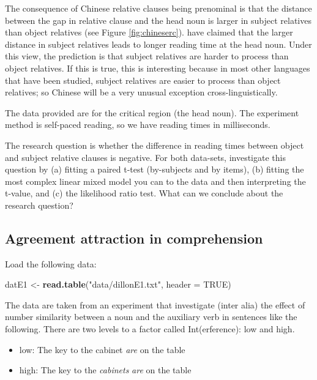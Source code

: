 \documentclass[12pt,]{krantz}
\newenvironment{Shaded}{\begin{snugshade}}{\end{snugshade}}
\newcommand{\DataTypeTok}[1]{\textcolor[rgb]{0.13,0.29,0.53}{#1}}
\newcommand{\KeywordTok}[1]{\textcolor[rgb]{0.13,0.29,0.53}{\textbf{#1}}}
\newcommand{\NormalTok}[1]{#1}
\newcommand{\OtherTok}[1]{\textcolor[rgb]{0.56,0.35,0.01}{#1}}
\newcommand{\StringTok}[1]{\textcolor[rgb]{0.31,0.60,0.02}{#1}}
\providecommand{\tightlist}{%
  \setlength{\itemsep}{0pt}\setlength{\parskip}{0pt}}
\begin{document}
The consequence of Chinese relative clauses being prenominal is that the distance between the gap in relative clause and the head noun is larger in subject relatives than object relatives (see Figure \ref{fig:chineserc}). \citet{hsiao03} have claimed that the larger distance in subject relatives leads to longer reading time at the head noun. Under this view, the prediction is that subject relatives are harder to process than object relatives. If this is true, this is interesting because in most other languages that have been studied, subject relatives are easier to process than object relatives; so Chinese will be a very unusual exception cross-linguistically.

The data provided are for the critical region (the head noun). The experiment method is self-paced reading, so we have reading times in milliseconds.

The research question is whether the difference in reading times between object and subject relative clauses is negative. For both data-sets, investigate this question by (a) fitting a paired t-test (by-subjects and by items), (b) fitting the most complex linear mixed model you can to the data and then interpreting the t-value, and (c) the likelihood ratio test. What can we conclude about the research question?

\hypertarget{sec:HypTestExerciseAgrmt}{%
\subsection{Agreement attraction in comprehension}\label{sec:HypTestExerciseAgrmt}}

Load the following data:

\begin{Shaded}
\begin{Highlighting}[]
\NormalTok{datE1 <-}\StringTok{ }\KeywordTok{read.table}\NormalTok{(}\StringTok{"data/dillonE1.txt"}\NormalTok{, }
  \DataTypeTok{header =} \OtherTok{TRUE}\NormalTok{)}
\end{Highlighting}
\end{Shaded}

The data are taken from an experiment that investigate (inter alia) the effect of number similarity between a noun and the auxiliary verb in sentences like the following. There are two levels to a factor called Int(erference): low and high.

\begin{itemize}
\tightlist
\item
  low: The key to the cabinet \emph{are} on the table
\item
  high: The key to the \emph{cabinets} \emph{are} on the table
\end{itemize}
\end{document}
